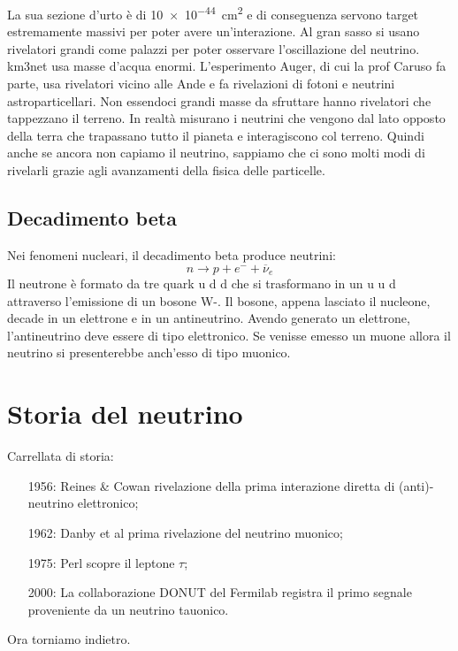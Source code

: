         La sua sezione d'urto è di \SI{10e-44}{\centi\meter\squared} e di conseguenza servono target estremamente massivi per poter avere un'interazione. Al gran sasso si usano rivelatori grandi come palazzi per poter osservare l'oscillazione del neutrino. km3net usa masse d'acqua enormi. L'esperimento Auger, di cui la prof Caruso fa parte, usa rivelatori vicino alle Ande e fa rivelazioni di fotoni e neutrini astroparticellari. Non essendoci grandi masse da sfruttare hanno rivelatori che tappezzano il terreno. In realtà misurano i neutrini che vengono dal lato opposto della terra che trapassano tutto il pianeta e interagiscono col terreno. Quindi anche se ancora non capiamo il neutrino, sappiamo che ci sono molti modi di rivelarli grazie agli avanzamenti della fisica delle particelle.
    \subsection{Decadimento beta}
        Nei fenomeni nucleari, il decadimento beta produce neutrini:
        \begin{equation*}
            n \rightarrow p + e^- + \overline{\nu}_e
        \end{equation*}
        Il neutrone è formato da tre quark u d d che si trasformano in un u u d attraverso l'emissione di un bosone W-. Il bosone, appena lasciato il nucleone, decade in un elettrone e in un antineutrino. Avendo generato un elettrone, l'antineutrino deve essere di tipo elettronico. Se venisse emesso un muone allora il neutrino si presenterebbe anch'esso di tipo muonico.
\section{Storia del neutrino}
        Carrellata di storia:
        \begin{enumerate}
            \item[1956:] Reines \& Cowan rivelazione della prima interazione diretta di (anti)-neutrino elettronico;
            \item[1962:] Danby et al prima rivelazione del neutrino muonico;
            \item[1975:] Perl scopre il leptone $\tau$;
            \item[2000:] La collaborazione DONUT del Fermilab registra il primo segnale proveniente da un neutrino tauonico.
        \end{enumerate}
        Ora torniamo indietro.
